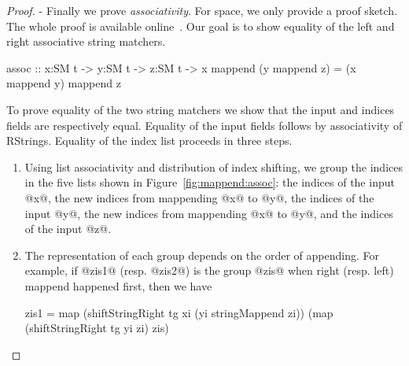 \begin{proof}
- Finally we prove \textit{associativity}.
For space, we only provide a proof sketch.
The whole proof is available online~\cite{implementation}.
%
Our goal is to show equality of the left and right associative string matchers.
%
\begin{code}
assoc :: x:SM t -> y:SM t -> z:SM t
       -> { x mappend (y mappend z) = (x mappend y) mappend z}
\end{code}
To prove equality of the two string matchers we show
that the input and indices fields are respectively equal.
%
Equality of the input fields follows by associativity of RStrings.
%
Equality of the index list proceeds in three steps.
%
\begin{enumerate}
\item Using list associativity and distribution of index shifting,
we group the indices in the five lists shown in
Figure~\ref{fig:mappend:assoc}: the indices of the input @x@, the new
indices from mappending @x@ to @y@, the indices of the input @y@, the
new indices from mappending @x@ to @y@, and the indices of the input
@z@.
\item The representation of each group depends on the order of appending.
For example, if @zis1@ (resp. @zis2@) is the group @zis@ when
right (resp. left) mappend happened first, then we have
\begin{code}
zis1 = map (shiftStringRight tg xi (yi stringMappend zi))
           (map (shiftStringRight tg yi zi) zis)


\end{code}
\end{enumerate}
\end{proof}
